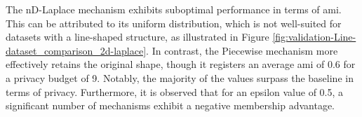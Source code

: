 The nD-Laplace mechanism exhibits suboptimal performance in terms of \gls{ami}. This can be attributed to its uniform distribution, which is not well-suited for datasets with a line-shaped structure, as illustrated in Figure \ref{fig:validation-Line-dataset_comparison_2d-laplace}. In contrast, the Piecewise mechanism more effectively retains the original shape, though it registers an average \gls{ami} of 0.6 for a privacy budget of 9. Notably, the majority of the values surpass the baseline in terms of privacy. Furthermore, it is observed that for an epsilon value of 0.5, a significant number of mechanisms exhibit a negative membership advantage.

